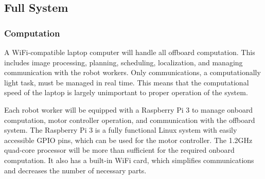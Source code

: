 
\subsection{Full System}
\label{sec:hardware_full_system}

\subsubsection{Computation}
\label{sec:computation}
A WiFi-compatible laptop computer will handle all offboard computation. This includes image processing, planning, scheduling, localization, and managing communication with the robot workers. Only communications, a computationally light task, must be managed in real time. This means that the computational speed of the laptop is largely unimportant to proper operation of the system. 

Each robot worker will be equipped with a Raspberry Pi 3 to manage onboard computation, motor controller operation, and communication with the offboard system. The Raspberry Pi 3 is a fully functional Linux system with easily accessible GPIO pins, which can be used for the motor controller. The 1.2GHz quad-core processor will be more than sufficient for the required onboard computation. It also has a built-in WiFi card, which simplifies communications and decreases the number of necessary parts. 